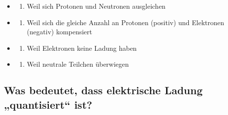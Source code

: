 \documentclass[
  11pt,
]{article}
\providecommand{\tightlist}{%
  \setlength{\itemsep}{0pt}\setlength{\parskip}{0pt}}
\begin{document}
\begin{itemize}
\tightlist
\item
  \begin{enumerate}
  \def\labelenumi{\Alph{enumi})}
  \tightlist
  \item
    Weil sich Protonen und Neutronen ausgleichen\\
  \end{enumerate}
\item
  \begin{enumerate}
  \def\labelenumi{\Alph{enumi})}
  \setcounter{enumi}{1}
  \tightlist
  \item
    Weil sich die gleiche Anzahl an Protonen (positiv) und Elektronen
    (negativ) kompensiert\\
  \end{enumerate}
\item
  \begin{enumerate}
  \def\labelenumi{\Alph{enumi})}
  \setcounter{enumi}{2}
  \tightlist
  \item
    Weil Elektronen keine Ladung haben\\
  \end{enumerate}
\item
  \begin{enumerate}
  \def\labelenumi{\Alph{enumi})}
  \setcounter{enumi}{3}
  \tightlist
  \item
    Weil neutrale Teilchen überwiegen
  \end{enumerate}
\end{itemize}

\subsection{Was bedeutet, dass elektrische Ladung „quantisiert``
ist?}\label{was-bedeutet-dass-elektrische-ladung-quantisiert-ist}
\end{document}
